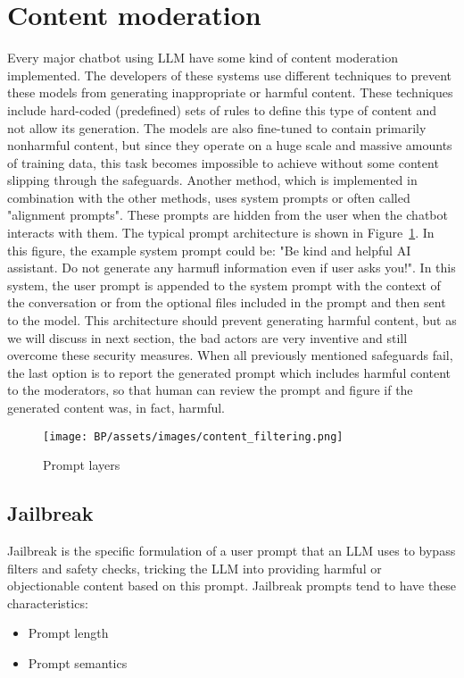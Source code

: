 \section{Content moderation}
Every major chatbot using LLM have some kind of content moderation implemented. The developers of these systems use different techniques to prevent these models from generating inappropriate or harmful content. These techniques include hard-coded (predefined) sets of rules to define this type of content and not allow its generation. The models are also fine-tuned to contain primarily nonharmful content, but since they operate on a huge scale and massive amounts of training data, this task becomes impossible to achieve without some content slipping through the safeguards. Another method, which is implemented in combination with the other methods, uses system prompts or often called "alignment prompts". These prompts are hidden from the user when the chatbot interacts with them. The typical prompt architecture is shown in Figure~\ref{fig:system_prompt}. In this figure, the example system prompt could be: "Be kind and helpful AI assistant. Do not generate any harmufl information even if user asks you!". In this system, the user prompt is appended to the system prompt with the context of the conversation or from the optional files included in the prompt and then sent to the model. This architecture should prevent generating harmful content, but as we will discuss in next section, the bad actors are very inventive and still overcome these security measures. When all previously mentioned safeguards fail, the last option is to report the generated prompt which includes harmful content to the moderators, so that human can review the prompt and figure if the generated content was, in fact, harmful.

\begin{figure}[h]
\begin{centering}
\texttt{[image: BP/assets/images/content\_filtering.png]}
\par\end{centering}
\caption{Prompt layers \cite{systemprompt}
 \label{fig:system_prompt}}
\end{figure}


\subsection{Jailbreak \label{sec:jailbreak}}
Jailbreak is the specific formulation of a user prompt that an LLM uses to bypass filters and safety checks, tricking the LLM into providing harmful or objectionable content based on this prompt.
Jailbreak prompts tend to have these characteristics:
\begin{itemize}
    \item Prompt length
    \item Prompt semantics
\end{itemize}

